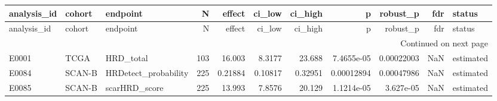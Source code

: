 \begin{longtable}{lllrrrrrrrl}
\toprule
analysis\_id & cohort & endpoint & N & effect & ci\_low & ci\_high & p & robust\_p & fdr & status \\
\midrule
\endfirsthead
\toprule
analysis\_id & cohort & endpoint & N & effect & ci\_low & ci\_high & p & robust\_p & fdr & status \\
\midrule
\endhead
\midrule
\multicolumn{11}{r}{Continued on next page} \\
\midrule
\endfoot
\bottomrule
\endlastfoot
E0001 & TCGA & HRD\_total & 103 & 16.003 & 8.3177 & 23.688 & 7.4655e-05 & 0.00022003 & NaN & estimated \\
E0084 & SCAN-B & HRDetect\_probability & 225 & 0.21884 & 0.10817 & 0.32951 & 0.00012894 & 0.00047986 & NaN & estimated \\
E0085 & SCAN-B & scarHRD\_score & 225 & 13.993 & 7.8576 & 20.129 & 1.1214e-05 & 3.627e-05 & NaN & estimated \\
\end{longtable}
